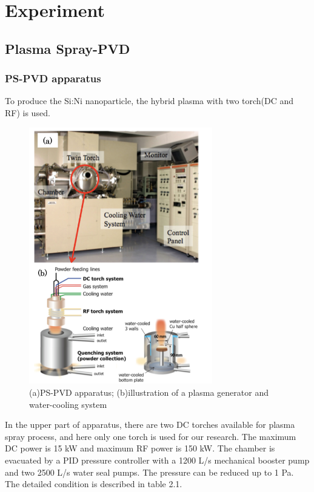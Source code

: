 \chapter{Experiment}
\section{Plasma Spray-PVD}
\subsection{PS-PVD apparatus}
To produce the Si:Ni nanoparticle, the hybrid plasma with two torch(DC and RF) is used.
\begin{figure}[h]
\centering
\includegraphics[width=8cm]{src/fig/fig20.png}
\caption{(a)PS-PVD apparatus; (b)illustration of a plasma generator and water-cooling system}
\end{figure}
In the upper part of apparatus, there are two DC torches available for plasma spray process, and here only one torch is used for our research. The maximum DC power is 15 kW and maximum RF power is 150 kW. The chamber is evacuated by a PID pressure controller with a 1200 L/s mechanical booster pump and two 2500 L/s water seal pumps. The pressure can be reduced up to 1 Pa. The detailed condition is described in table 2.1.\\
